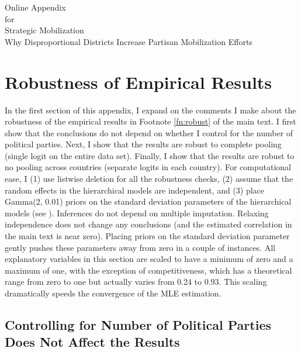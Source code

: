 \documentclass[12pt]{article}
\begin{document}
\begin{appendix}

\newpage


\begin{center}
{\LARGE Online Appendix}\\\vspace{2mm}
{for}\\\vspace{2mm}
{\Large Strategic Mobilization}\\\vspace{2mm}
{\large Why Disproportional Districts Increase Partisan Mobilization Efforts}\\
\end{center}


\tableofcontents
 

\section{Robustness of Empirical Results}

In the first section of this appendix, I expand on the comments I make about the robustness of the empirical results in Footnote \ref{fn:robust} of the main text. I first show that the conclusions do not depend on whether I control for the number of political parties. Next, I show that the results are robust to complete pooling (single logit on the entire data set). Finally, I show that the results are robust to no pooling across countries (separate logits in each country). For computational ease, I (1) use listwise deletion for all the robustness checks, (2) assume that the random effects in the hierarchical models are independent, and (3) place Gamma(2, 0.01) priors on the standard deviation parameters of the hierarchical models (see \citealt{Chungetal2013}). Inferences do not depend on multiple imputation. Relaxing independence does not change any conclusions (and the estimated correlation in the main text is near zero). Placing priors on the standard deviation parameter gently pushes these parameters away from zero in a couple of instances. All explanatory variables in this section are scaled to have a minimum of zero and a maximum of one, with the exception of competitiveness, which has a theoretical range from zero to one but actually varies from 0.24 to 0.93. This scaling dramatically speeds the convergence of the MLE estimation.

\clearpage
\subsection{Controlling for Number of Political Parties Does Not Affect the Results}


\end{appendix}
\end{document}
